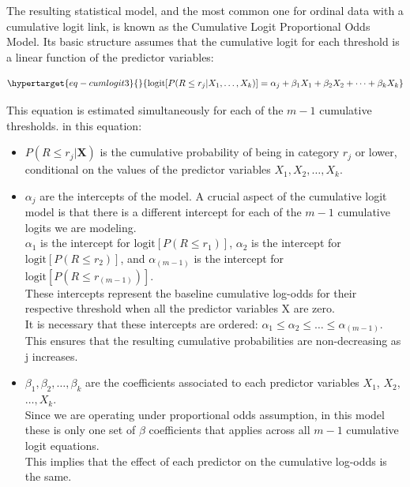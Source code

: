 \documentclass[
  letterpaper,
  DIV=11,
  numbers=noendperiod]{scrartcl}
\begin{document}
The resulting statistical model, and the most common one for ordinal
data with a cumulative logit link, is known as the Cumulative Logit
Proportional Odds Model. Its basic structure assumes that the cumulative
logit for each threshold is a linear function of the predictor
variables:

\begin{equation}\protect\hypertarget{eq-cumlogit3}{}{
\text{logit}[P(R\leq r_j | X_1, \dots, X_k)] = \alpha_j + \beta_1X_1 + \beta_2X_2 + \dots + \beta_kX_k
}\label{eq-cumlogit3}\end{equation}

This equation is estimated simultaneously for each of the \(m-1\)
cumulative thresholds. in this equation:

\begin{itemize}
\item
  \(P(R \leq r_j | \boldsymbol{X})\) is the cumulative probability of
  being in category \(r_j\) or lower, conditional on the values of the
  predictor variables \(X_1 ,X_2, \dots, X_k\).
\item
  \(\alpha_j\) are the intercepts of the model. A crucial aspect of the
  cumulative logit model is that there is a different intercept for each
  of the \(m-1\) cumulative logits we are modeling.\\
  \(\alpha_1\) is the intercept for \(\text{logit}[P(R\leq r_1)]\),
  \(\alpha_2\) is the intercept for \(\text{logit}[P(R\leq r_2)]\), and
  \(\alpha_{(m-1)}\) is the intercept for
  \(\text{logit}[P(R\leq r_{(m-1)})]\).\\
  These intercepts represent the baseline cumulative log-odds for their
  respective threshold when all the predictor variables X are zero.\\
  It is necessary that these intercepts are ordered:
  \(\alpha_1 \leq \alpha_2 \leq \dots \leq \alpha_{(m-1)}\).\\
  This ensures that the resulting cumulative probabilities are
  non-decreasing as j increases.
\item
  \(\beta_1, \beta_2, \dots, \beta_k\) are the coefficients associated
  to each predictor variables \(X_1\), \(X_2\), \(\dots, X_k\).\\
  Since we are operating under proportional odds assumption, in this
  model these is only one set of \(\beta\) coefficients that applies
  across all \(m-1\) cumulative logit equations.\\
  This implies that the effect of each predictor on the cumulative
  log-odds is the same.
\end{itemize}
\end{document}
